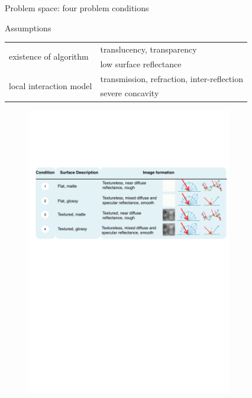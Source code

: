 \documentclass[10pt]{beamer}
\begin{document}
\begin{frame}{Problem space: four problem conditions}

\begin{exampleblock}{Assumptions}
\begin{table}
\centering
\begin{tabular}{ll}
\multirow{2}{*}{existence of algorithm} & translucency, transparency \\
& low surface reflectance \\ \cline{1-2}
\multirow{2}{*}{local interaction model} & transmission, refraction, inter-reflection \\
& severe concavity \\
\end{tabular}
\end{table}

\end{exampleblock}

\begin{figure}[h]
\includegraphics[width=0.8\textwidth]{prob_space/prob_cond}
\end{figure}

\end{frame}
\end{document}
